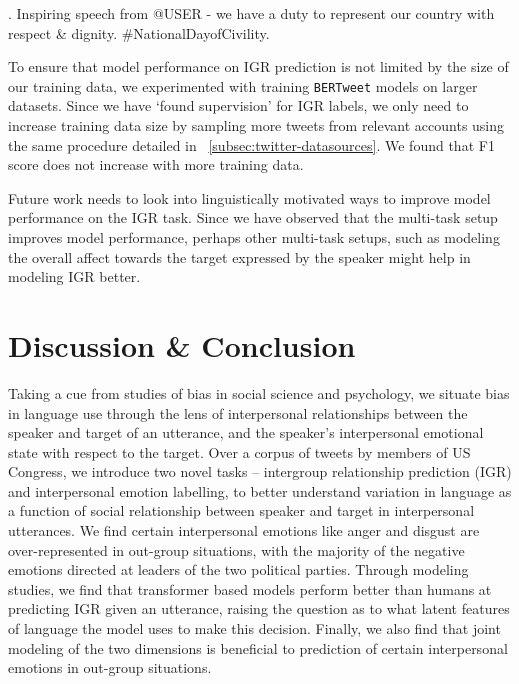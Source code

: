 \ex. \label{ex:admiration} Inspiring speech from @USER - we have a duty to represent our country with respect \& dignity. \#NationalDayofCivility.

To ensure that model performance on IGR prediction is not limited by the size of our training data, we experimented with training \texttt{BERTweet} models on larger datasets. Since we have `found supervision' for IGR labels, we only need to increase training data size by sampling more tweets from relevant accounts using the same procedure detailed in \textsection~\ref{subsec:twitter-datasources}. We found that F1 score does not increase with more training data.

Future work needs to look into linguistically motivated ways to improve model performance on the IGR task. Since we have observed that the multi-task setup improves model performance, perhaps other multi-task setups, such as modeling the overall affect towards the target expressed by the speaker might help in modeling IGR better.



\section{Discussion \& Conclusion}

Taking a cue from studies of bias in social science and psychology, we situate bias in language use through the lens of interpersonal relationships between the speaker and target of an utterance, and the speaker's interpersonal emotional state with respect to the target. Over a corpus of tweets by members of US Congress,  we introduce two novel tasks -- intergroup relationship prediction (IGR) and interpersonal emotion labelling, to better understand variation in language as a function of social relationship between speaker and target in interpersonal utterances. We find certain interpersonal emotions like anger and disgust are over-represented in out-group situations, with the majority of the negative emotions directed at leaders of the two political parties. Through modeling studies, we find that transformer based models perform better than humans at predicting IGR given an utterance, raising the question as to what latent features of language the model uses to make this decision. Finally, we also find that joint modeling of the two dimensions is beneficial to prediction of certain interpersonal emotions in out-group situations. 


